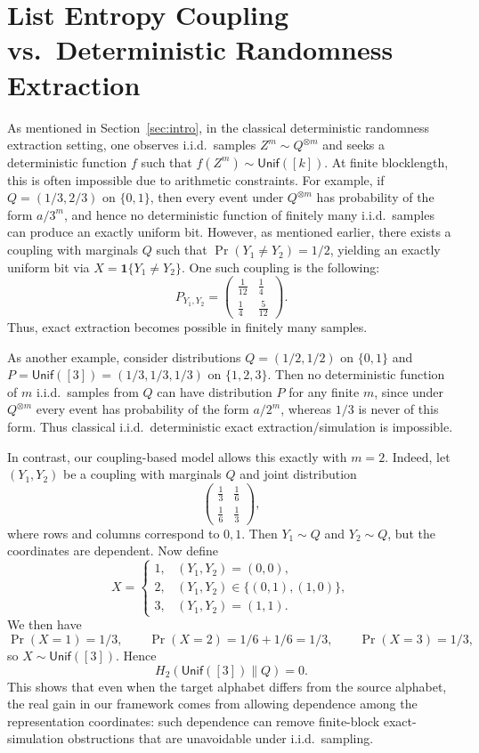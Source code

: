 \documentclass[journal]{IEEEtran}
\newcommand{\1}{\mathbf{1}}
\newcommand{\Unif}{\mathsf{Unif}}
\begin{document}
\section{List Entropy Coupling vs.\ Deterministic Randomness Extraction }\label{app:randomness}
As mentioned in Section~\ref{sec:intro}, in the classical deterministic randomness extraction setting, one observes i.i.d.\ samples $Z^m\sim Q^{\otimes m}$ and seeks a deterministic function $f$ such that $f(Z^m)\sim \Unif([k])$. At finite blocklength, this is often impossible due to arithmetic constraints. For example, if $Q=(1/3,2/3)$ on $\{0,1\}$, then every event under $Q^{\otimes m}$ has probability of the form $a/3^m$, and hence no deterministic function of finitely many i.i.d.\ samples can produce an exactly uniform bit. However, as mentioned earlier, there exists a coupling with marginals $Q$ such that $\Pr(Y_1\neq Y_2)=1/2$, yielding an exactly uniform bit via $X=\mathbf{1}\{Y_1\neq Y_2\}$.  One such coupling is the following: 
$$P_{Y_1,Y_2} = \begin{pmatrix}
   \tfrac1{12} & \tfrac1{4}\\
    \tfrac1{4} & \tfrac5{12}
\end{pmatrix}.$$
Thus, exact extraction becomes possible in finitely many samples.


As another example, consider distributions $Q=(1/2,1/2)$ on $\{0,1\}$ and 
\(P=\Unif([3])=(1/3,1/3,1/3)\) on $\{1,2,3\}$.
Then no deterministic function of \(m\) i.i.d.\ samples from \(Q\) can have distribution \(P\) for any finite \(m\), since under \(Q^{\otimes m}\) every event has probability of the form \(a/2^m\), whereas \(1/3\) is never of this form. Thus classical i.i.d.\ deterministic exact extraction/simulation is impossible.

In contrast, our coupling-based model allows this exactly with \(m=2\). Indeed, let \((Y_1,Y_2)\) be a coupling with marginals \(Q\) and joint distribution
\[
\begin{pmatrix}
\tfrac13 & \tfrac16\\
\tfrac16 & \tfrac13
\end{pmatrix},
\]
where rows and columns correspond to \(0,1\). Then \(Y_1\sim Q\) and \(Y_2\sim Q\), but the coordinates are dependent. Now define
\[
X=
\begin{cases}
1, & (Y_1,Y_2)=(0,0),\\
2, & (Y_1,Y_2)\in\{(0,1),(1,0)\},\\
3, & (Y_1,Y_2)=(1,1).
\end{cases}
\]
We then have
\[
\Pr(X=1)=1/3,\qquad
\Pr(X=2)=1/6+1/6=1/3,\qquad
\Pr(X=3)=1/3,
\]
so \(X\sim \Unif([3])\). Hence
\[H_2(\Unif([3])\|Q)=0.\]
This shows that even when the target alphabet differs from the source alphabet, the real gain in our framework comes from allowing dependence among the representation coordinates: such dependence can remove finite-block exact-simulation obstructions that are unavoidable under i.i.d.\ sampling. 
\end{document}
